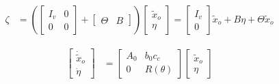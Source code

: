 \documentclass[12pt,a4paper]{article}
\begin{document}
\begin{align*}
\zeta &= \left(
\begin{bmatrix} I_v & 0 \\ 0 & 0 \end{bmatrix} +
\left[\begin{array}{c|c} \Theta & B \end{array}\right]
\right)
\begin{bmatrix} \tilde{x}_o \\ \eta \end{bmatrix}
= \begin{bmatrix} I_v \\ 0 \end{bmatrix} \tilde{x}_o + B\eta + \Theta \tilde{x}_o
\end{align*}

\begin{align*}
\begin{bmatrix} \dot{\tilde{x}}_o \\ \dot{\eta} \end{bmatrix}
&= \begin{bmatrix} A_0 & b_0c_c \\ 0 & R(\theta) \end{bmatrix}
\begin{bmatrix} \tilde{x}_o \\ \eta \end{bmatrix}
\end{align*}
\end{document}
